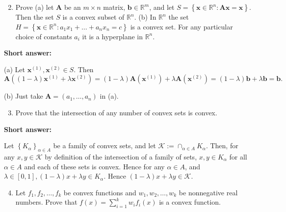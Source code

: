 \medskip
\noindent
\begin{enumerate}
	\setcounter{enumi}{1}
	
	\item Prove
	(a) let \( \boldsymbol{A}\) be an \(m \times n\) matrix, \( \boldsymbol{b} \in \mathbb{R}^m\), and let \(S=\left\{ \boldsymbol{x} \in \mathbb{R}^n:  \boldsymbol{A}  \boldsymbol{x}= \boldsymbol{x}\right\}\). Then the set \(S\) is a convex subset of \(\mathbb{R}^n\).
	(b) In \(\mathbb{R}^n\) the set \(H=\left\{ \boldsymbol{x} \in \mathbb{R}^n: a_1 x_1+\ldots+a_n x_n=c\right\}\) is a convex set. For any particular choice of constants \(a_i\) it is a hyperplane in \(\mathbb{R}^n\).
	
\end{enumerate}


\textbf{Short answer:}

(a) Let \( \boldsymbol{x}^{(1)},  \boldsymbol{x}^{(2)} \in S\). Then
\[
 \boldsymbol{A}\left((1-\lambda)  \boldsymbol{x}^{(1)}+\lambda  \boldsymbol{x}^{(2)}\right)=(1-\lambda)  \boldsymbol{A}\left( \boldsymbol{x}^{(1)}\right)+\lambda  \boldsymbol{A}\left( \boldsymbol{x}^{(2)}\right)=(1-\lambda)  \boldsymbol{b}+\lambda  \boldsymbol{b}= \boldsymbol{b} .
\]

(b) Just take \( \boldsymbol{A}=\left(a_1, \ldots, a_n\right)\) in (a).



\medskip
\noindent
\begin{enumerate}
	\setcounter{enumi}{2}
	
	\item Prove that the intersection of any number of convex sets is convex.
	
\end{enumerate}


\textbf{Short answer:}

Let \(\left\{K_\alpha\right\}_{\alpha \in A}\) be a family of convex sets, and let \(\mathcal{K}:=\cap_{\alpha \in A} K_\alpha\). Then, for any \(x, y \in \mathcal{K}\) by definition of the intersection of a family of sets, \(x, y \in K_\alpha\) for all \(\alpha \in A\) and each of these sets is convex. Hence for any \(\alpha \in A\), and \(\lambda \in[0,1],(1-\lambda) x+\lambda y \in K_\alpha\). Hence \((1-\lambda) x+\lambda y \in \mathcal{K}\).



\medskip
\noindent
\begin{enumerate}
	\setcounter{enumi}{3}
	
	\item Let \(f_1, f_2, \ldots, f_k\) be convex functions and \(w_1, w_2, \ldots, w_k\) be nonnegative real numbers. Prove that \(f(x)=\sum_{i=1}^k w_i f_i(x)\) is a convex function.
	
\end{enumerate}


